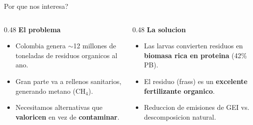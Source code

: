 \documentclass[aspectratio=169,11pt]{beamer}
\begin{document}
\begin{frame}{Por que nos interesa?}
  \begin{columns}
    \begin{column}{0.48\textwidth}
      \textbf{El problema}
      \begin{itemize}
        \item Colombia genera $\sim$12 millones de toneladas de residuos organicos al ano.
        \item Gran parte va a rellenos sanitarios, generando metano (CH$_4$).
        \item Necesitamos alternativas que \textbf{valoricen} en vez de \textbf{contaminar}.
      \end{itemize}
    \end{column}
    \begin{column}{0.48\textwidth}
      \textbf{La solucion}
      \begin{itemize}
        \item Las larvas convierten residuos en \textbf{biomasa rica en proteina} (42\% PB).
        \item El residuo (frass) es un \textbf{excelente fertilizante organico}.
        \item Reduccion de emisiones de GEI vs. descomposicion natural.
      \end{itemize}
    \end{column}
  \end{columns}
  \vspace{0.4cm}
  \centering
\end{frame}
\end{document}
